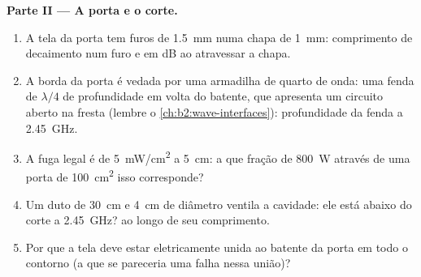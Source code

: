\begin{problem}
\medskip
\noindent\textbf{Parte II --- A porta e o corte.}
\begin{enumerate}[resume]
  \item A tela da porta tem furos de \qty{1.5}{mm} numa chapa de \qty{1}{mm}: comprimento
        de decaimento num furo e  em dB ao atravessar a chapa.
  \item A borda da porta é vedada por uma armadilha de quarto de onda: uma fenda
        de $\lambda/4$ de profundidade em volta do batente, que apresenta um circuito
        aberto na fresta (lembre o \cref{ch:b2:wave-interfaces}): profundidade
        da fenda a \qty{2.45}{GHz}.
  \item A fuga legal é de \qty{5}{mW/cm^2} a \qty{5}{cm}: a que fração de
        \qty{800}{W} através de uma porta de \qty{100}{cm^2} isso corresponde?
  \item Um duto de \qty{30}{cm} e \qty{4}{cm} de diâmetro ventila a cavidade: ele está
        abaixo do corte a \qty{2.45}{GHz}?  ao longo de seu comprimento.
  \item Por que a tela deve estar eletricamente unida ao batente da porta em todo o
        contorno (a que se pareceria uma falha nessa união)?
\end{enumerate}


\end{problem}
